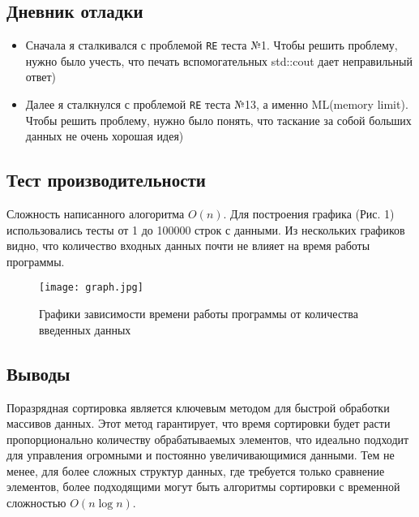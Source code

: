 \documentclass[12pt]{article}
\begin{document}
\newpage
\subsection*{Дневник отладки}

\begin{itemize}
    \item Сначала я сталкивался с проблемой \texttt{RE} теста №1. Чтобы решить проблему, нужно было учесть, что печать вспомогательных std::cout дает неправильный ответ)
    \item Далее я сталкнулся с проблемой \texttt{RE} теста №13, а именно ML(memory limit). Чтобы решить проблему, нужно было понять, что таскание за собой больших данных не очень хорошая идея)
\end{itemize}

\newpage
\subsection*{Тест производительности}

Сложность написанного алогоритма $O(n)$. Для построения графика (Рис. 1) использовались тесты от 1 до 100000 строк с данными.
Из нескольких графиков видно, что количество входных данных почти не влияет на время работы программы.

\begin{figure}
    \centering
    \texttt{[image: graph.jpg]}
    \caption{Графики зависимости времени работы программы от количества введенных данных}
\end{figure}

\newpage
\subsection*{Выводы}

Поразрядная сортировка является ключевым методом для быстрой обработки массивов данных.
Этот метод гарантирует, что время сортировки будет расти пропорционально количеству обрабатываемых элементов, что идеально подходит для управления огромными и постоянно увеличивающимися данными.
Тем не менее, для более сложных структур данных, где требуется только сравнение элементов, более подходящими могут быть алгоритмы сортировки с временной сложностью $O(n \log n)$.
\end{document}
